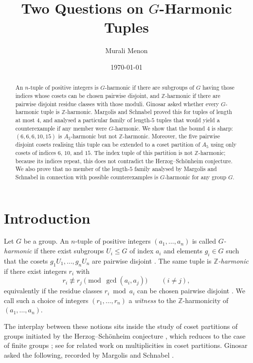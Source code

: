 \documentclass[12pt]{article}
\title{Two Questions on $G$-Harmonic Tuples}
\author{Murali Menon}
\date{\today}
\theoremstyle{remark}
\newcommand{\Z}{\mathbb{Z}}
\begin{document}
\maketitle

\begin{abstract}
An $n$-tuple of positive integers is $G$-harmonic if there are subgroups of $G$ having those indices whose cosets can be chosen pairwise disjoint, and $\Z$-harmonic if there are pairwise disjoint residue classes with those moduli. Ginosar asked whether every $G$-harmonic tuple is $\Z$-harmonic. Margolis and Schnabel proved this for tuples of length at most $4$, and analysed a particular family of length-$5$ tuples that would yield a counterexample if any member were $G$-harmonic. We show that the bound $4$ is sharp: $(6,6,6,10,15)$ is $A_5$-harmonic but not $\Z$-harmonic. Moreover, the five pairwise disjoint cosets realising this tuple can be extended to a coset partition of $A_5$ using only cosets of indices $6$, $10$, and $15$. The index tuple of this partition is not $\Z$-harmonic; because its indices repeat, this does not contradict the Herzog--Sch\"onheim conjecture. We also prove that no member of the length-$5$ family analysed by Margolis and Schnabel in connection with possible counterexamples is $G$-harmonic for any group $G$.
\end{abstract}

\section{Introduction}

Let $G$ be a group. An $n$-tuple of positive integers $(a_1,\ldots,a_n)$ is called \emph{$G$-harmonic} if there exist subgroups $U_i\le G$ of index $a_i$ and elements $g_i\in G$ such that the cosets $g_1U_1,\ldots,g_nU_n$ are pairwise disjoint \cite[Definition~1.1]{MargolisSchnabel}. The same tuple is \emph{$\Z$-harmonic} if there exist integers $r_i$ with
\[
r_i \not\equiv r_j \pmod{\gcd(a_i,a_j)} \qquad (i \neq j),
\]
equivalently if the residue classes $r_i \bmod a_i$ can be chosen pairwise disjoint \cite[p.~2]{MargolisSchnabel}. We call such a choice of integers $(r_1,\ldots,r_n)$ a \emph{witness} to the $\Z$-harmonicity of $(a_1,\ldots,a_n)$.

The interplay between these notions sits inside the study of coset partitions of groups initiated by the Herzog--Sch\"onheim conjecture \cite{HerzogSchonheim}, which reduces to the case of finite groups \cite{KorecZnam}; see \cite{GinosarSchnabel2011,Ginosar2018} for related work on multiplicities in coset partitions. Ginosar asked the following, recorded by Margolis and Schnabel \cite[Question~1]{MargolisSchnabel}.
\end{document}
